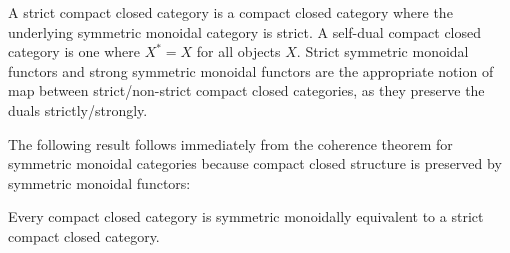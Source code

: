 \begin{definition}
\begin{description}
%
\end{description}

A strict compact closed category is a compact closed category where the underlying symmetric monoidal category is strict.
A self-dual compact closed category is one where $X^*=X$ for all objects $X$.
Strict symmetric monoidal functors and strong symmetric monoidal functors are the appropriate notion of map between strict/non-strict compact closed categories, as they preserve the duals strictly/strongly.
\end{definition}
The following result follows immediately from the coherence theorem for symmetric monoidal categories because compact closed structure is preserved by symmetric monoidal functors:
\begin{theorem}
Every compact closed category is  symmetric monoidally equivalent to a strict compact closed category. 
\end{theorem}
